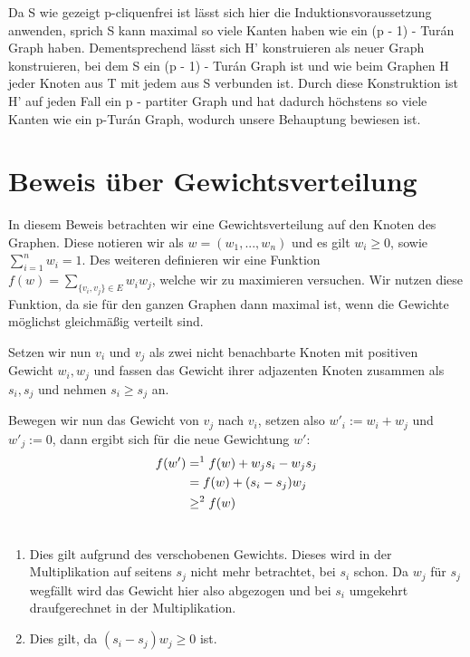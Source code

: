 \documentclass[12pt, a4paper]{article}
\begin{document}
Da S wie gezeigt p-cliquenfrei ist lässt sich hier die Induktionsvoraussetzung anwenden, sprich S kann maximal so viele Kanten haben wie ein (p - 1) - Turán Graph haben. Dementsprechend lässt sich H' konstruieren als neuer Graph konstruieren, bei dem S ein (p - 1) - Turán Graph ist und wie beim Graphen H jeder Knoten aus T mit jedem aus S verbunden ist. Durch diese Konstruktion ist H' auf jeden Fall ein p - partiter Graph und hat dadurch höchstens so viele Kanten wie ein p-Turán Graph, wodurch unsere Behauptung bewiesen ist.


\section{Beweis über Gewichtsverteilung}
\label{proof/third::doc}\label{proof/third:dritter-beweis-gewichtsverteilung}
In diesem Beweis betrachten wir eine Gewichtsverteilung auf den Knoten des Graphen. Diese notieren wir als $w = (w_1,...,w_n)$ und es gilt $w_i \ge 0$, sowie $\sum^n_{i=1}w_i = 1$. Des weiteren definieren wir eine Funktion $f(w) = \sum_{ \{v_i, v_j\} \in E} w_i w_j$, welche wir zu maximieren versuchen. Wir nutzen diese Funktion, da sie für den ganzen Graphen dann maximal ist, wenn die Gewichte möglichst gleichmäßig verteilt sind.

Setzen wir nun $v_i$ und $v_j$ als zwei nicht benachbarte Knoten mit positiven Gewicht $w_i, w_j$ und fassen das Gewicht ihrer adjazenten Knoten zusammen als $s_i, s_j$ und nehmen $s_i \ge s_j$ an.

Bewegen wir nun das Gewicht von $v_j$ nach $v_i$, setzen also $w'_i := w_i + w_j$ und $w'_j := 0$, dann ergibt sich für die neue Gewichtung $w'$:
\begin{gather}
\begin{split}f(w') &=^1 f(w) + w_j s_i - w_j s_j \\
&= f(w) + (s_i - s_j) w_j \\
&\ge^2 f(w)\end{split}\notag\\\begin{split}\end{split}\notag
\end{gather}\begin{enumerate}
\item {}
Dies gilt aufgrund des verschobenen Gewichts. Dieses wird in der Multiplikation auf seitens $s_j$ nicht mehr betrachtet, bei $s_i$ schon. Da $w_j$ für $s_j$ wegfällt wird das Gewicht hier also abgezogen und bei $s_i$ umgekehrt draufgerechnet in der Multiplikation.

\item {}
Dies gilt, da $(s_i - s_j) w_j \ge 0$ ist.

\end{enumerate}
\end{document}
